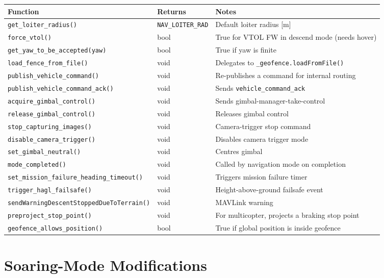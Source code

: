 \documentclass[12pt,a4paper]{article}
\begin{document}
\begin{center}\begin{tabular}{lll}\toprule
Function & Returns & Notes \\\midrule
\texttt{get\_loiter\_radius()} & \texttt{NAV\_LOITER\_RAD} & Default loiter radius [m] \\
\texttt{force\_vtol()} & bool & True for VTOL FW in descend mode (needs hover) \\
\texttt{get\_yaw\_to\_be\_accepted(yaw)} & bool & True if yaw is finite \\
\texttt{load\_fence\_from\_file()} & void & Delegates to \texttt{\_geofence.loadFromFile()} \\
\texttt{publish\_vehicle\_command()} & void & Re-publishes a command for internal routing \\
\texttt{publish\_vehicle\_command\_ack()} & void & Sends \texttt{vehicle\_command\_ack} \\
\texttt{acquire\_gimbal\_control()} & void & Sends gimbal-manager-take-control \\
\texttt{release\_gimbal\_control()} & void & Releases gimbal control \\
\texttt{stop\_capturing\_images()} & void & Camera-trigger stop command \\
\texttt{disable\_camera\_trigger()} & void & Disables camera trigger mode \\
\texttt{set\_gimbal\_neutral()} & void & Centres gimbal \\
\texttt{mode\_completed()} & void & Called by navigation mode on completion \\
\texttt{set\_mission\_failure\_heading\_timeout()} & void & Triggers mission failure timer \\
\texttt{trigger\_hagl\_failsafe()} & void & Height-above-ground failsafe event \\
\texttt{sendWarningDescentStoppedDueToTerrain()} & void & MAVLink warning \\
\texttt{preproject\_stop\_point()} & void & For multicopter, projects a braking stop point \\
\texttt{geofence\_allows\_position()} & bool & True if global position is inside geofence \\
\bottomrule\end{tabular}\end{center}

\part{Soaring-Mode Modifications}
\end{document}
